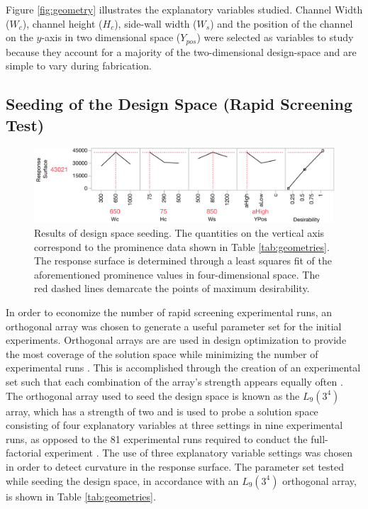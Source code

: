 Figure \ref{fig:geometry} illustrates the explanatory variables studied. Channel Width ($W_c$), channel height ($H_c$), side-wall width ($W_s$) and the position of the channel on the $y$-axis in two dimensional space ($Y_{pos}$) were selected as variables to study because they account for a majority of the two-dimensional design-space and are simple to vary during fabrication.

\subsection{Seeding of the Design Space (Rapid Screening Test)}
\label{ssec:seeding}

\begin{figure}[htb]
  \begin{minipage}[t]{0.99\linewidth}\centering
    \includegraphics[width=14cm]{L9}
  \end{minipage}\hfill
  \caption[Results of initial seeding of design space]{Results of design space seeding. The quantities on the vertical axis correspond to the prominence data shown in Table \ref{tab:geometries}. The response surface is determined through a least squares fit of the aforementioned prominence values in four-dimensional space. The red dashed lines demarcate the points of maximum desirability.}
	\label{fig:L9}
\end{figure}

In order to economize the number of rapid screening experimental runs, an orthogonal array was chosen to generate a useful parameter set for the initial experiments. Orthogonal arrays are are used in design optimization to provide the most coverage of the solution space while minimizing the number of experimental runs \cite{yokoyama1993taguchi}. This is accomplished through the creation of an experimental set such that each combination of the array's strength appears equally often \cite{hedayat2012orthogonal}. The orthogonal array used to seed the design space is known as the $L_9 (3^4)$ array, which has a strength of two and is used to probe a solution space consisting of four explanatory variables at three settings in nine experimental runs, as opposed to the 81 experimental runs required to conduct the full-factorial experiment \cite{hedayat2012orthogonal}. The use of three explanatory variable settings was chosen in order to detect curvature in the response surface. The parameter set tested while seeding the design space, in accordance with an $L_9 (3^4)$ orthogonal array, is shown in Table \ref{tab:geometries}.


